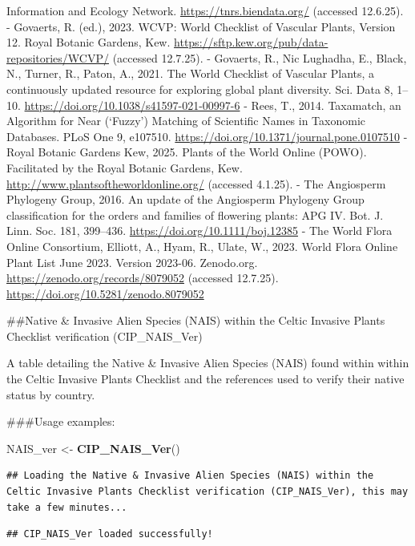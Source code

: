 \documentclass[
]{article}
\newenvironment{Shaded}{\begin{snugshade}}{\end{snugshade}}
\newcommand{\FunctionTok}[1]{\textcolor[rgb]{0.13,0.29,0.53}{\textbf{#1}}}
\newcommand{\NormalTok}[1]{#1}
\newcommand{\OtherTok}[1]{\textcolor[rgb]{0.56,0.35,0.01}{#1}}
\begin{document}
Information and Ecology Network. \url{https://tnrs.biendata.org/}
(accessed 12.6.25). - Govaerts, R. (ed.), 2023. WCVP: World Checklist of
Vascular Plants, Version 12. Royal Botanic Gardens, Kew.
\url{https://sftp.kew.org/pub/data-repositories/WCVP/} (accessed
12.7.25). - Govaerts, R., Nic Lughadha, E., Black, N., Turner, R.,
Paton, A., 2021. The World Checklist of Vascular Plants, a continuously
updated resource for exploring global plant diversity. Sci. Data 8,
1--10. \url{https://doi.org/10.1038/s41597-021-00997-6} - Rees, T.,
2014. Taxamatch, an Algorithm for Near (`Fuzzy') Matching of Scientific
Names in Taxonomic Databases. PLoS One 9, e107510.
\url{https://doi.org/10.1371/journal.pone.0107510} - Royal Botanic
Gardens Kew, 2025. Plants of the World Online (POWO). Facilitated by the
Royal Botanic Gardens, Kew. \url{http://www.plantsoftheworldonline.org/}
(accessed 4.1.25). - The Angiosperm Phylogeny Group, 2016. An update of
the Angiosperm Phylogeny Group classification for the orders and
families of flowering plants: APG IV. Bot. J. Linn. Soc. 181, 399--436.
\url{https://doi.org/10.1111/boj.12385} - The World Flora Online
Consortium, Elliott, A., Hyam, R., Ulate, W., 2023. World Flora Online
Plant List June 2023. Version 2023-06. Zenodo.org.
\url{https://zenodo.org/records/8079052} (accessed 12.7.25).
\url{https://doi.org/10.5281/zenodo.8079052}

\#\#Native \& Invasive Alien Species (NAIS) within the Celtic Invasive
Plants Checklist verification (CIP\_NAIS\_Ver)

A table detailing the Native \& Invasive Alien Species (NAIS) found
within within the Celtic Invasive Plants Checklist and the references
used to verify their native status by country.

\#\#\#Usage examples:

\begin{Shaded}
\begin{Highlighting}[]
\NormalTok{NAIS\_ver }\OtherTok{\textless{}{-}} \FunctionTok{CIP\_NAIS\_Ver}\NormalTok{()}
\end{Highlighting}
\end{Shaded}

\begin{verbatim}
## Loading the Native & Invasive Alien Species (NAIS) within the Celtic Invasive Plants Checklist verification (CIP_NAIS_Ver), this may take a few minutes...
\end{verbatim}

\begin{verbatim}
## CIP_NAIS_Ver loaded successfully!
\end{verbatim}
\end{document}
